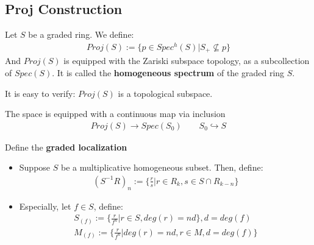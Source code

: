 \documentclass[Total.tex]{subfiles}
\begin{document}
			\subsection{Proj Construction}
			\begin{Def}
				Let $S$ be a graded ring. We define:
				\begin{gather*}
					Proj(S):=\{p\in Spec^h(S)|S_+\not\subseteq p\}
				\end{gather*}
				And $Proj(S)$ is equipped with the Zariski subspace topology, as a subcollection of $Spec(S)$. It is called the \textbf{homogeneous spectrum} of the graded ring $S$.
			\end{Def}
			
			It is easy to verify: $Proj(S)$ is a topological subspace.
						
			The space is equipped with a continuous map via inclusion
			\begin{gather*}
				Proj(S)\rightarrow Spec(S_0)\qquad S_0\hookrightarrow S
			\end{gather*}
			\begin{Def}
				Define the \textbf{graded localization}
				\begin{itemize}
					\item Suppose $S$ be a multiplicative homogeneous subset. Then, define:
					\begin{gather*}
						(S^{-1}R)_n:=\{\frac{r}{s}|r\in R_k,s\in S\cap R_{k-n}\}
					\end{gather*}
					\item Especially, let $f\in S$, define:
					\begin{gather*}
						S_{(f)}:=\{\frac{r}{f^n}|r\in S,deg(r)=nd\},d=deg(f)\\
						M_{(f)}:=\{\frac{r}{f^n}|deg(r)=nd,r\in M,d=deg(f)\}
					\end{gather*}
				\end{itemize}
			\end{Def}
			
\end{document}
